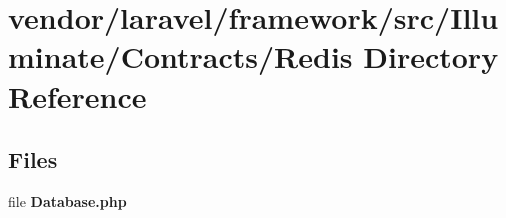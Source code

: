 \section{vendor/laravel/framework/src/\+Illuminate/\+Contracts/\+Redis Directory Reference}
\label{dir_c871cb9f60c2051b0320b41574be614c}
\subsection*{Files}
\begin{DoxyCompactItemize}
\item 
file {\bf Database.\+php}
\end{DoxyCompactItemize}
